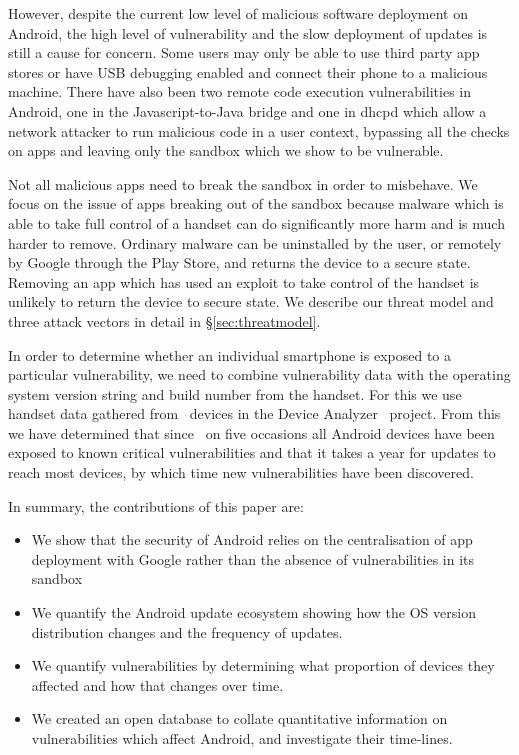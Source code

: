 \documentclass{llncs}
\newcommand{\da}{Device Analyzer}
\begin{document}
However, despite the current low level of malicious software deployment on Android, the high level of vulnerability and the slow deployment of updates is still a cause for concern.
Some users may only be able to use third party app stores or have USB debugging enabled and connect their phone to a malicious machine.
There have also been two remote code execution vulnerabilities in Android, one in the Javascript-to-Java bridge and one in dhcpd which allow a network attacker to run malicious code in a user context, bypassing all the checks on apps and leaving only the sandbox which we show to be vulnerable.

Not all malicious apps need to break the sandbox in order to misbehave.
We focus on the issue of apps breaking out of the sandbox because malware which is able to take full control of a handset can do significantly more harm and is much harder to remove.
Ordinary malware can be uninstalled by the user, or remotely by Google through the Play Store, and returns the device to a secure state. 
Removing an app which has used an exploit to take control of the handset is unlikely to return the device to secure state.
We describe our threat model and three attack vectors in detail in \S\ref{sec:threatmodel}.


In order to determine whether an individual smartphone is exposed to a particular vulnerability, we need to combine vulnerability data with the operating system version string and build number from the handset.
For this we use handset data gathered from \daNumOSDevices\ devices in the \da~\cite{Wagner2013} project.
From this we have determined that since \daStartDate\ on five occasions all Android devices have been exposed to known critical vulnerabilities and that it takes a year for updates to reach most devices, by which time new vulnerabilities have been discovered.


In summary, the contributions of this paper are:
\begin{itemize}
 \item We show that the security of Android relies on the centralisation of app deployment with Google rather than the absence of vulnerabilities in its sandbox
 \item We quantify the Android update ecosystem showing how the OS version distribution changes and the frequency of updates.
 \item We quantify vulnerabilities by determining what proportion of devices they affected and how that changes over time.
 \item We created an open database to collate quantitative information on vulnerabilities which affect Android, and investigate their time-lines.
\end{itemize}
\end{document}
